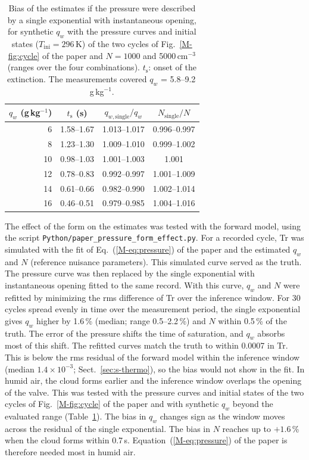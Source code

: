 \documentclass[12pt]{article}
\begin{document}
\begin{table}[!htbp]
\centering
\caption{Bias of the estimates if the pressure were described by a single exponential with
instantaneous opening, for synthetic $q_w$ with the pressure curves and initial states
($T_\mathrm{ini} = 296$\,K) of the two cycles of Fig.~\ref{M-fig:cycle} of the paper and
$N = 1000$ and 5000\,cm$^{-3}$ (ranges over the four combinations). $t_\mathrm{s}$: onset of the extinction.
The measurements covered $q_w$ = 5.8--9.2\,g\,kg$^{-1}$.}
\label{tab:s_pform}
\small
\begin{tabular}{rccc}
\toprule
$q_w$ (g\,kg$^{-1}$) & $t_\mathrm{s}$ (s) & $q_{w,\mathrm{single}}/q_w$ & $N_\mathrm{single}/N$ \\
\midrule
6  & 1.58--1.67 & 1.013--1.017 & 0.996--0.997 \\
8  & 1.23--1.30 & 1.009--1.010 & 0.999--1.002 \\
10 & 0.98--1.03 & 1.001--1.003 & 1.001 \\
12 & 0.78--0.83 & 0.992--0.997 & 1.001--1.009 \\
14 & 0.61--0.66 & 0.982--0.990 & 1.002--1.014 \\
16 & 0.46--0.51 & 0.979--0.985 & 1.004--1.016 \\
\bottomrule
\end{tabular}
\end{table}

The effect of the form on the estimates was tested with the forward model, using the script
\texttt{Python/\allowbreak paper\_pressure\_form\_effect.py}.
For a recorded cycle, Tr was simulated with the fit
of Eq.~(\ref{M-eq:pressure}) of the paper and the estimated $q_w$ and $N$ (reference nuisance parameters).
This simulated curve served as the truth. The pressure curve was then replaced by the single exponential
with instantaneous opening fitted to the same record. With this curve, $q_w$ and $N$ were refitted by
minimizing the rms difference of Tr over the inference window. For 30 cycles spread evenly in time over the
measurement period, the single exponential gives $q_w$ higher by 1.6\,\% (median; range 0.5--2.2\,\%) and
$N$ within
0.5\,\% of the truth.
The error of the pressure shifts the time of saturation, and $q_w$ absorbs most of this shift.
The refitted curves match the truth to within 0.0007 in Tr. This is below the rms residual of the
forward model within the inference window (median $1.4\times10^{-3}$; Sect.~\ref{sec:s-thermo}), so the
bias would not show in the fit.
In humid air, the cloud forms earlier and the inference window
overlaps the opening of the valve. This was tested with the pressure curves and initial states of the two
cycles of Fig.~\ref{M-fig:cycle} of the paper and with synthetic $q_w$ beyond the evaluated range
(Table~\ref{tab:s_pform}). The bias in $q_w$ changes sign as the window moves across the residual of the
single exponential. The bias in $N$ reaches up to $+1.6$\,\% when the cloud forms within 0.7\,s.
Equation~(\ref{M-eq:pressure}) of the paper is therefore needed most in humid air.
\end{document}
